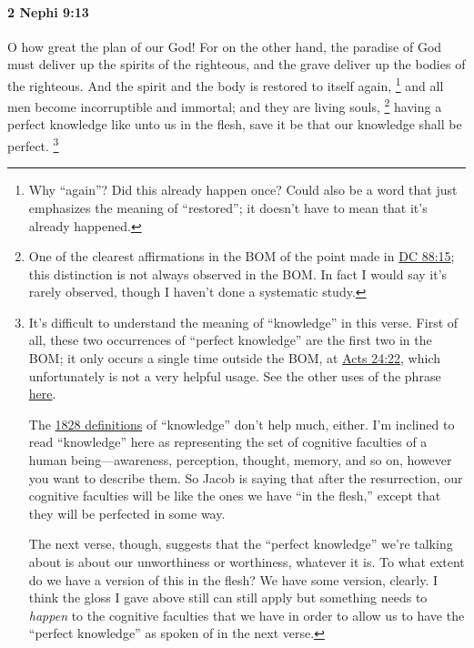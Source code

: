 		\paragraph{2 Nephi 9:13} %
			\label{2NEPHI-9-13}

			O how great the plan of our God!
			For on the other hand,
			the paradise of God must deliver up the spirits of the righteous,
			and the grave deliver up the bodies of the righteous.
			And the spirit and the body is restored to itself again,%
				\footnote{%
					\label{2NEPHI-9-13-again}%
					Why ``again''? Did this already happen once? Could also be a word that just emphasizes the meaning of ``restored''; it doesn't have to mean that it's already happened.
					}
			and all men become incorruptible and immortal;
			and they are living souls,%
				\footnote{%
					\label{2NEPHI-9-13-souls}%
					One of the clearest affirmations in the BOM of the point made in \hyperref[DC88-15]{DC 88:15}; this distinction is not always observed in the BOM. In fact I would say it's rarely observed, though I haven't done a systematic study.
					}
			having a perfect knowledge like unto us in the flesh,
			save it be that our knowledge shall be perfect.%
				\footnote{%
					\label{2NEPHI-9-13-perfect}%
					It's difficult to understand the meaning of ``knowledge'' in this verse. First of all, these two occurrences of ``perfect knowledge'' are the first two in the BOM; it only occurs a single time outside the BOM, at \hyperref[ACTS-24-22]{Acts 24:22}, which unfortunately is not a very helpful usage. See the other uses of the phrase \hyperref[KNOWLEDGE-PHRASES]{here}.
					
					The \hyperref[KNOWLEDGE-1828]{1828 definitions} of ``knowledge'' don't help much, either. I'm inclined to read ``knowledge'' here as representing the set of cognitive faculties of a human being---awareness, perception, thought, memory, and so on, however you want to describe them. So Jacob is saying that after the resurrection, our cognitive faculties will be like the ones we have ``in the flesh,'' except that they will be perfected in some way.
					
					The next verse, though, suggests that the ``perfect knowledge'' we're talking about is about our unworthiness or worthiness, whatever it is. To what extent do we have a version of this in the flesh? We have some version, clearly. I think the gloss I gave above still can still apply but something needs to \textit{happen} to the cognitive faculties that we have in order to allow us to have the ``perfect knowledge'' as spoken of in the next verse.
					}


